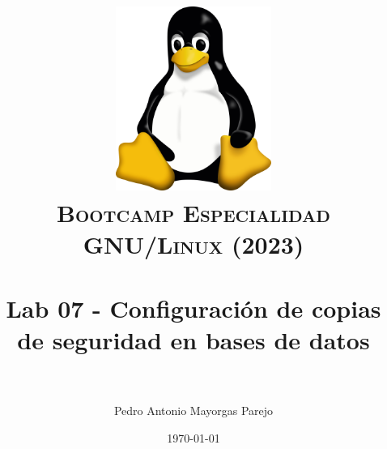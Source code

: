 

\graphicspath{ {img/} }

\title{
\normalfont \normalsize
\includegraphics[width=6cm,height=6cm]{logo}\\
\textsc{\textbf{Bootcamp Especialidad GNU/Linux (2023)}} \\ [25pt] %
\horrule{0.5pt} \\[0.4cm] %
\huge Lab 07 - Configuración de copias de seguridad en bases de datos \\ %
\horrule{2pt} \\[0.5cm] %
}



\author{Pedro Antonio Mayorgas Parejo} %

\date{\normalsize\today} %




\maketitle %

\newpage %

\tableofcontents %

\newpage

